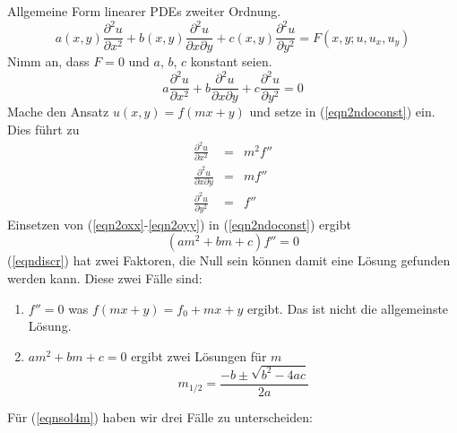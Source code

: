Allgemeine Form linearer PDEs zweiter Ordnung.
\begin{equation}
	a(x,y) \frac{\partial^2 u}{\partial x^2}+
	b(x,y)\frac{\partial^2 u}{\partial x\partial y}+
	c(x,y)\frac{\partial^2 u}{\partial y^2}=F(x,y;u,u_x,u_y)
\end{equation}
Nimm an, dass $F=0$ und $a$, $b$, $c$ konstant seien.
\begin{equation}
        a\frac{\partial^2 u}{\partial x^2}+b\frac{\partial^2 u}{\partial x\partial y}+
        c\frac{\partial^2 u}{\partial y^2}=0
	\label{eqn2ndoconst}
\end{equation}
Mache den Ansatz $u(x,y)=f(mx+y)$ und setze in (\ref{eqn2ndoconst}) ein. Dies führt zu
\begin{eqnarray}
	\frac{\partial^2 u}{\partial x^2}&=&m^2f''\label{eqn2oxx}\\
	\frac{\partial^2 u}{\partial x\partial y}&=&mf''\label{eqn2oxy}\\
	\frac{\partial^2 u}{\partial y^2}&=&f'' \label{eqn2oyy}
\end{eqnarray}
Einsetzen von (\ref{eqn2oxx}-\ref{eqn2oyy}) in (\ref{eqn2ndoconst}) ergibt
\begin{equation}
	(am^2+bm+c)f''=0\label{eqndiscr}
\end{equation}
(\ref{eqndiscr}) hat zwei Faktoren, die Null sein können damit eine Lösung gefunden werden kann.
Diese zwei Fälle sind:
\begin{enumerate}
	\item $f''=0$ was $f(mx+y)=f_0+mx+y$ ergibt. Das ist nicht die allgemeinste Lösung.
	\item $am^2+bm+c=0$ ergibt zwei Lösungen für $m$
	\begin{equation}
		m_{1/2}=\frac{-b\pm\sqrt{b^2-4ac}}{2a}
		\label{eqnsol4m}
	\end{equation}
\end{enumerate}
Für (\ref{eqnsol4m}) haben wir drei Fälle zu unterscheiden:
